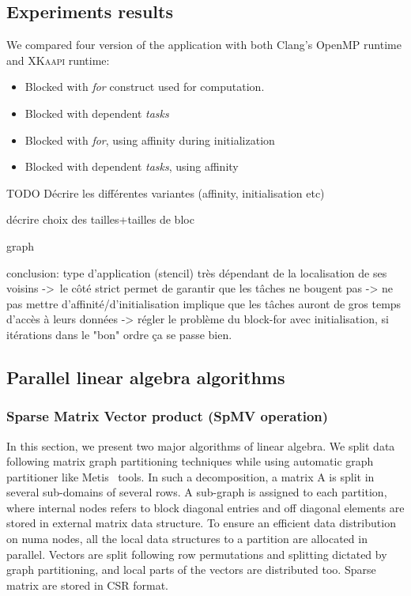 \documentclass{Styles/llncs}
\newcommand{\kaapi}{\textsc{\mbox{XKaapi}}\xspace}
\begin{document}
\subsection{Experiments results}

We compared four version of the application with both Clang's OpenMP runtime
and \kaapi runtime:

\begin{itemize}
  \item Blocked with \emph{for} construct used for computation.
  \item Blocked with dependent \emph{tasks}
  \item Blocked with \emph{for}, using affinity during initialization
  \item Blocked with dependent \emph{tasks}, using affinity
\end{itemize}

TODO Décrire les différentes variantes
(affinity, initialisation etc)

décrire choix des tailles+tailles de bloc

graph

conclusion: type d'application (stencil) très dépendant de la localisation de ses voisins
-> le côté strict permet de garantir que les tâches ne bougent pas
-> ne pas mettre d'affinité/d'initialisation implique que les tâches auront de gros temps d'accès à leurs données
-> régler le problème du block-for avec initialisation, si itérations dans le "bon" ordre ça se passe bien.

\subsection{Parallel linear algebra algorithms}

\subsubsection{Sparse Matrix Vector product (SpMV operation)}

In this section, we present two major algorithms of linear algebra. We split data following matrix graph partitioning techniques \cite{Saad:2003:IMS:829576} while using automatic graph partitioner like Metis~\cite{metis} tools. In such a decomposition, a matrix A is split in several sub-domains of several rows. A sub-graph is assigned to each partition, where internal nodes refers to block diagonal entries and off diagonal elements are stored in external matrix data structure. To ensure an efficient data distribution on numa nodes, all the local data structures to a partition are allocated in parallel. Vectors are split following row permutations and splitting dictated by graph partitioning, and local parts of the vectors are distributed too. Sparse matrix are stored in CSR format.
\end{document}
